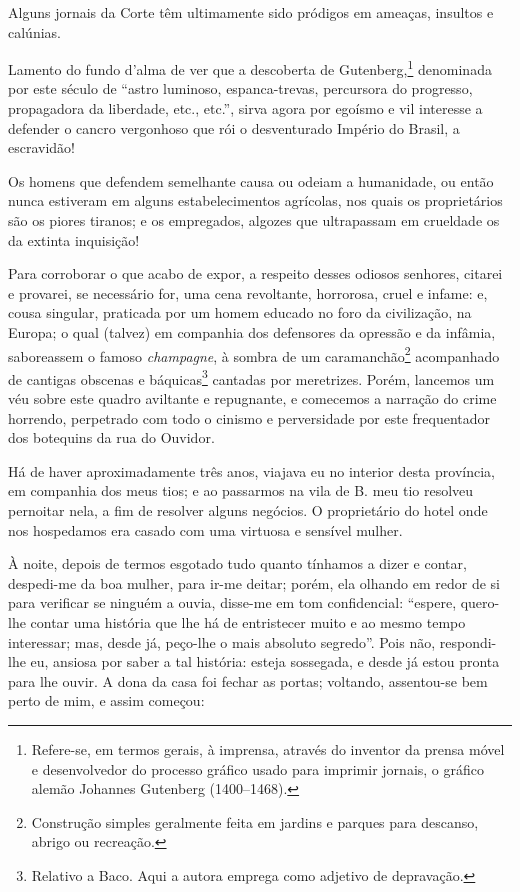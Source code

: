 Alguns jornais da Corte têm ultimamente sido pródigos em ameaças,
insultos e calúnias.

Lamento do fundo d'alma de ver que a descoberta de Gutenberg,\footnote{
  Refere-se, em termos gerais, à imprensa, através do inventor da prensa
  móvel e desenvolvedor do processo gráfico usado para imprimir jornais,
  o gráfico alemão Johannes Gutenberg (1400--1468).} denominada por este
século de ``astro luminoso, espanca-trevas, percursora do progresso,
propagadora da liberdade, etc., etc.'', sirva agora por egoísmo e vil
interesse a defender o cancro vergonhoso que rói o desventurado Império
do Brasil, a escravidão!

Os homens que defendem semelhante causa ou odeiam a humanidade, ou então
nunca estiveram em alguns estabelecimentos agrícolas, nos quais os
proprietários são os piores tiranos; e os empregados, algozes que
ultrapassam em crueldade os da extinta inquisição!

Para corroborar o que acabo de expor, a respeito desses odiosos
senhores, citarei e provarei, se necessário for, uma cena revoltante,
horrorosa, cruel e infame: e, cousa singular, praticada por um homem
educado no foro da civilização, na Europa; o qual (talvez) em companhia
dos defensores da opressão e da infâmia, saboreassem o famoso
\emph{champagne}, à sombra de um caramanchão\footnote{Construção
  simples geralmente feita em jardins e parques para descanso, abrigo ou
  recreação.} acompanhado de cantigas obscenas e báquicas\footnote{
  Relativo a Baco. Aqui a autora emprega como adjetivo de depravação.} 
cantadas por meretrizes. Porém, lancemos um véu sobre este quadro
aviltante e repugnante, e comecemos a narração do crime horrendo,
perpetrado com todo o cinismo e perversidade por este frequentador dos
botequins da rua do Ouvidor.

Há de haver aproximadamente três anos, viajava eu no interior desta
província, em companhia dos meus tios; e ao passarmos na vila de B. meu
tio resolveu pernoitar nela, a fim de resolver alguns negócios. O
proprietário do hotel onde nos hospedamos era casado com uma virtuosa e
sensível mulher.

À noite, depois de termos esgotado tudo quanto tínhamos a dizer e
contar, despedi-me da boa mulher, para ir-me deitar; porém, ela olhando
em redor de si para verificar se ninguém a ouvia, disse-me em tom
confidencial: ``espere, quero-lhe contar uma história que lhe há de
entristecer muito e ao mesmo tempo interessar; mas, desde já, peço-lhe o
mais absoluto segredo''. Pois não, respondi-lhe eu, ansiosa por saber a
tal história: esteja sossegada, e desde já estou pronta para lhe ouvir.
A dona da casa foi fechar as portas; voltando, assentou-se bem perto de
mim, e assim começou:


